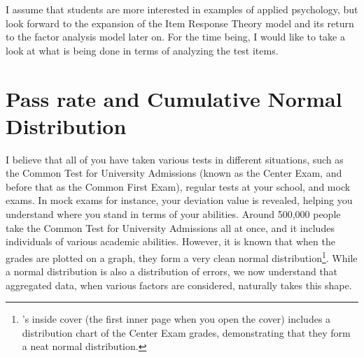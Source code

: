 \documentclass{ltjsbook}
\begin{document}
I assume that students are more interested in examples of applied psychology, but look forward to the expansion of the Item Response Theory model and its return to the factor analysis model later on.
For the time being, I would like to take a look at what is being done in terms of analyzing the test items.

\section{Pass rate and Cumulative Normal Distribution}
I believe that all of you have taken various tests in different situations, such as the Common Test for University Admissions (known as the Center Exam, and before that as the Common First Exam), regular tests at your school, and mock exams. In mock exams for instance, your deviation value is revealed, helping you understand where you stand in terms of your abilities. Around 500,000 people take the Common Test for University Admissions all at once, and it includes individuals of various academic abilities. However, it is known that when the grades are plotted on a graph, they form a very clean normal distribution\footnote{\textcite{Yamauchi201001}'s inside cover (the first inner page when you open the cover) includes a distribution chart of the Center Exam grades, demonstrating that they form a neat normal distribution.}. While a normal distribution is also a distribution of errors, we now understand that aggregated data, when various factors are considered, naturally takes this shape.
\end{document}
